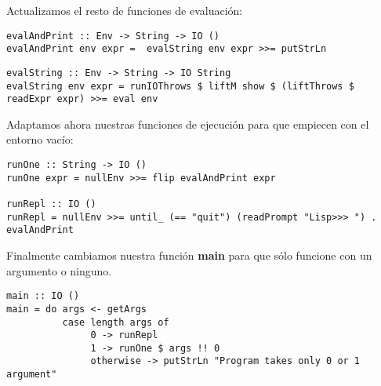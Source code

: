 Actualizamos el resto de funciones de evaluaci\'on:\\

\begin{minipage}{\linewidth}
\begin{footnotesize}
\begin{lstlisting}[frame=single]
evalAndPrint :: Env -> String -> IO ()
evalAndPrint env expr =  evalString env expr >>= putStrLn
\end{lstlisting}
\end{footnotesize}
\end{minipage}

\begin{minipage}{\linewidth}
\begin{tiny}
\begin{lstlisting}[frame=single]
evalString :: Env -> String -> IO String
evalString env expr = runIOThrows $ liftM show $ (liftThrows $ readExpr expr) >>= eval env
\end{lstlisting}
\end{tiny}
\end{minipage}

Adaptamos ahora nuestras funciones de ejecuci\'on para que empiecen con el entorno vac\'io:\\

\begin{minipage}{\linewidth}
\begin{scriptsize}
\begin{lstlisting}[frame=single]
runOne :: String -> IO ()
runOne expr = nullEnv >>= flip evalAndPrint expr

runRepl :: IO ()
runRepl = nullEnv >>= until_ (== "quit") (readPrompt "Lisp>>> ") . evalAndPrint
\end{lstlisting}
\end{scriptsize}
\end{minipage}

Finalmente cambiamos nuestra funci\'on \textbf{main} para que s\'olo funcione con un argumento o ninguno.\\

\begin{minipage}{\linewidth}
\begin{scriptsize}
\begin{lstlisting}[frame=single]
main :: IO ()
main = do args <- getArgs
          case length args of
               0 -> runRepl
               1 -> runOne $ args !! 0
               otherwise -> putStrLn "Program takes only 0 or 1 argument"
\end{lstlisting}
\end{scriptsize}
\end{minipage}

